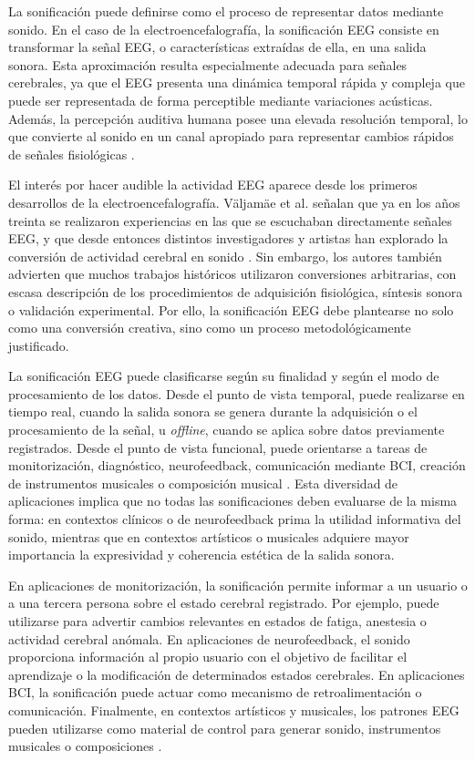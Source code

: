 \documentclass[../main.tex]{subfiles}
\begin{document}
La sonificación puede definirse como el proceso de representar datos mediante sonido. En el caso de la electroencefalografía, la sonificación EEG consiste en transformar la señal EEG, o características extraídas de ella, en una salida sonora. Esta aproximación resulta especialmente adecuada para señales cerebrales, ya que el EEG presenta una dinámica temporal rápida y compleja que puede ser representada de forma perceptible mediante variaciones acústicas. Además, la percepción auditiva humana posee una elevada resolución temporal, lo que convierte al sonido en un canal apropiado para representar cambios rápidos de señales fisiológicas \cite{Valjamae2013EEGSonification}.

El interés por hacer audible la actividad EEG aparece desde los primeros desarrollos de la electroencefalografía. Väljamäe et al. señalan que ya en los años treinta se realizaron experiencias en las que se escuchaban directamente señales EEG, y que desde entonces distintos investigadores y artistas han explorado la conversión de actividad cerebral en sonido \cite{Valjamae2013EEGSonification}. Sin embargo, los autores también advierten que muchos trabajos históricos utilizaron conversiones arbitrarias, con escasa descripción de los procedimientos de adquisición fisiológica, síntesis sonora o validación experimental. Por ello, la sonificación EEG debe plantearse no solo como una conversión creativa, sino como un proceso metodológicamente justificado.

La sonificación EEG puede clasificarse según su finalidad y según el modo de procesamiento de los datos. Desde el punto de vista temporal, puede realizarse en tiempo real, cuando la salida sonora se genera durante la adquisición o el procesamiento de la señal, u \textit{offline}, cuando se aplica sobre datos previamente registrados. Desde el punto de vista funcional, puede orientarse a tareas de monitorización, diagnóstico, neurofeedback, comunicación mediante BCI, creación de instrumentos musicales o composición musical \cite{Valjamae2013EEGSonification}. Esta diversidad de aplicaciones implica que no todas las sonificaciones deben evaluarse de la misma forma: en contextos clínicos o de neurofeedback prima la utilidad informativa del sonido, mientras que en contextos artísticos o musicales adquiere mayor importancia la expresividad y coherencia estética de la salida sonora.

En aplicaciones de monitorización, la sonificación permite informar a un usuario o a una tercera persona sobre el estado cerebral registrado. Por ejemplo, puede utilizarse para advertir cambios relevantes en estados de fatiga, anestesia o actividad cerebral anómala. En aplicaciones de neurofeedback, el sonido proporciona información al propio usuario con el objetivo de facilitar el aprendizaje o la modificación de determinados estados cerebrales. En aplicaciones BCI, la sonificación puede actuar como mecanismo de retroalimentación o comunicación. Finalmente, en contextos artísticos y musicales, los patrones EEG pueden utilizarse como material de control para generar sonido, instrumentos musicales o composiciones \cite{Valjamae2013EEGSonification}.
\end{document}
